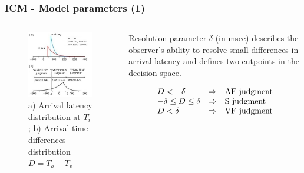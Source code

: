 \documentclass[xcolor={fixpdftex,hyperref,x11names},10pt,pdftex,hyperref={pdftex}]{beamer}
\begin{document}
\begin{frame}
\frametitle{ICM - Model parameters (1)}
 \begin{columns}[t]
  \begin{column}{0.50\textwidth}
   \begin{figure}[h]
      \includegraphics[width=50mm]{figs/SJ3_Figure1.jpg}
      \caption{a) Arrival latency distribution at $T_i$; 
      b) Arrival-time differences distribution $D=T_a-T_v$}
    \end{figure}
  \end{column}
  \begin{column}{0.50\textwidth}
    \vfill
    Resolution parameter $\delta$ (in msec) describes the 
    observer's ability to resolve small differences in arrival 
    latency and defines two cutpoints in the decision space. 
    
    \begin{equation*}
    \begin{array}{l l l}
    D<-\delta & \Rightarrow & \text {AF judgment}\\
    -\delta\leq D\leq\delta & \Rightarrow & \text {S judgment}\\
    D < \delta & \Rightarrow & \text {VF judgment} 
    \end{array}
    \end{equation*}
  \end{column}
 \end{columns}
\end{frame}
\end{document}

